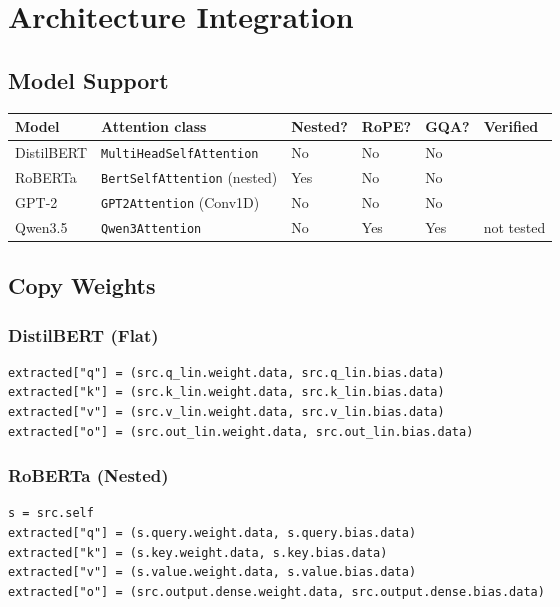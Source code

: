 
\section{Architecture Integration}

\subsection{Model Support}

\begin{table}[H]
\centering
\small
\begin{tabular}{llllll}
\toprule
\textbf{Model} & \textbf{Attention class} & \textbf{Nested?} & \textbf{RoPE?} & \textbf{GQA?} & \textbf{Verified} \\
\midrule
DistilBERT & \texttt{MultiHeadSelfAttention} & No & No & No &  \\
RoBERTa & \texttt{BertSelfAttention} (nested) & Yes & No & No &  \\
GPT-2 & \texttt{GPT2Attention} (Conv1D) & No & No & No &  \\
Qwen3.5 & \texttt{Qwen3Attention} & No & Yes & Yes & not tested \\
\bottomrule
\end{tabular}
\end{table}

\subsection{Copy Weights}

\subsubsection{DistilBERT (Flat)}

\begin{lstlisting}
extracted["q"] = (src.q_lin.weight.data, src.q_lin.bias.data)
extracted["k"] = (src.k_lin.weight.data, src.k_lin.bias.data)
extracted["v"] = (src.v_lin.weight.data, src.v_lin.bias.data)
extracted["o"] = (src.out_lin.weight.data, src.out_lin.bias.data)
\end{lstlisting}

\subsubsection{RoBERTa (Nested)}

\begin{lstlisting}
s = src.self
extracted["q"] = (s.query.weight.data, s.query.bias.data)
extracted["k"] = (s.key.weight.data, s.key.bias.data)
extracted["v"] = (s.value.weight.data, s.value.bias.data)
extracted["o"] = (src.output.dense.weight.data, src.output.dense.bias.data)
\end{lstlisting}

